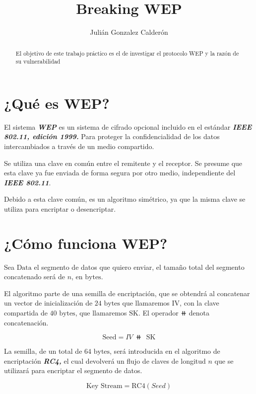 \documentclass[
]{article}
\title{Breaking WEP}
\author{Julián Gonzalez Calderón}
\date{}
\begin{document}
\maketitle
\begin{abstract}
El objetivo de este trabajo práctico es el de investigar el protocolo
WEP y la razón de su vulnerabilidad
\end{abstract}

\newpage

\hypertarget{quuxe9-es-wep}{%
\section{¿Qué es WEP?}\label{quuxe9-es-wep}}

El sistema \textbf{\emph{WEP}} es un sistema de cifrado opcional
incluido en el estándar \textbf{\emph{IEEE 802.11, edición 1999.}} Para
proteger la confidencialidad de los datos intercambiados a través de un
medio compartido.

Se utiliza una clave en común entre el remitente y el receptor. Se
presume que esta clave ya fue enviada de forma segura por otro medio,
independiente del \textbf{\emph{IEEE 802.11}}.

Debido a esta clave común, es un algoritmo simétrico, ya que la misma
clave se utiliza para encriptar o desencriptar.

\hypertarget{cuxf3mo-funciona-wep}{%
\section{¿Cómo funciona WEP?}\label{cuxf3mo-funciona-wep}}

Sea \(\text{Data}\) el segmento de datos que quiero enviar, el tamaño
total del segmento concatenado será de \(n\), en \(\text{bytes}\).

El algoritmo parte de una semilla de encriptación, que se obtendrá al
concatenar un vector de inicialización de \(24 \text{ bytes}\) que
llamaremos \(\text{IV}\), con la clave compartida de
\(40 \text{ bytes}\), que llamaremos \(\text{SK}\). El operador \(⧺\)
denota concatenación.

\[
\text{Seed} = IV \ ⧺\ \  \text{SK}
\]

La semilla, de un total de \(64 \text{ bytes}\), será introducida en el
algoritmo de encriptación \textbf{\emph{RC4,}} el cual devolverá un
flujo de claves de longitud \(n\) que se utilizará para encriptar el
segmento de datos.

\[
\text{Key Stream} = \text{RC4}(Seed)
\]
\end{document}
